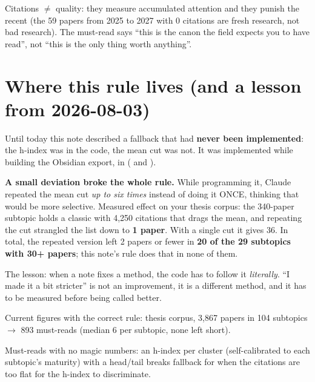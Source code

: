 \documentclass[11pt,a4paper]{article}
\begin{document}
\begin{ojo}
Citations $\neq$ quality: they measure accumulated attention and they punish the recent (the 59
papers from 2025 to 2027 with 0 citations are fresh research, not bad research). The must-read
says ``this is the canon the field expects you to have read'', not ``this is the only thing
worth anything''.
\end{ojo}

\section{Where this rule lives (and a lesson from 2026-08-03)}

Until today this note described a fallback that had \textbf{never been implemented}: the
h-index was in the code, the mean cut was not. It was implemented while building the
Obsidian export, in  ( and
).

\begin{ojo}
\textbf{A small deviation broke the whole rule.} While programming it, Claude repeated the
mean cut \emph{up to six times} instead of doing it ONCE, thinking that would be more
selective. Measured effect on your thesis corpus: the 340-paper subtopic holds a classic
with 4,250 citations that drags the mean, and repeating the cut strangled the list down to
\textbf{1 paper}. With a single cut it gives 36. In total, the repeated version left 2
papers or fewer in \textbf{20 of the 29 subtopics with 30+ papers}; this note's rule does
that in none of them.

The lesson: when a note fixes a method, the code has to follow it \emph{literally}. ``I made
it a bit stricter'' is not an improvement, it is a different method, and it has to be
measured before being called better.
\end{ojo}

Current figures with the correct rule: thesis corpus, 3,867 papers in 104 subtopics
$\rightarrow$ 893 must-reads (median 6 per subtopic, none left short).

\begin{resumen}
Must-reads with no magic numbers: an h-index per cluster (self-calibrated to each subtopic's
maturity) with a head/tail breaks fallback for when the citations are too flat for the h-index
to discriminate.
\end{resumen}
\end{document}
